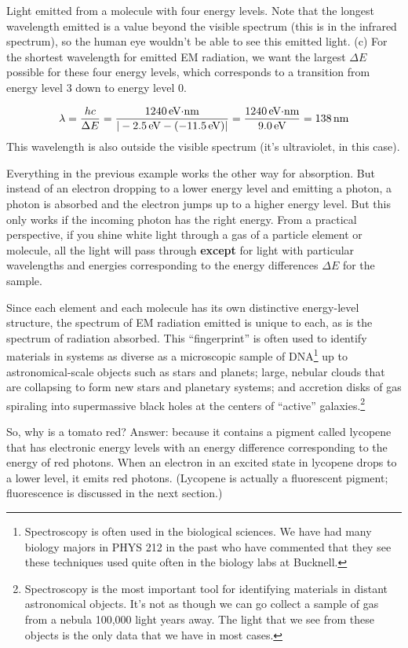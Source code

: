 \begin{example}{Light emitted from a molecule with four energy levels.}
Note that the longest wavelength emitted is a value beyond the visible spectrum
(this is in the infrared spectrum), so the human eye wouldn't be able
to see this emitted light. 
(c) For the shortest wavelength for emitted EM radiation, we want the
largest $\Delta E$ possible for these four energy levels, which corresponds
to a transition from energy level 3 down to energy level 0. 

\begin{equation}
\lambda = \frac{hc}{\Delta E} = \frac{1240 \,\mbox{eV$\cdot$nm}}{|-2.5 \,\mbox{eV} - (-11.5 \,\mbox{eV})|} 
= \frac{1240 \,\mbox{eV$\cdot$nm}}{9.0 \,\mbox{eV}} = 138 \,\mbox{nm} \nonumber
\end{equation}
This wavelength is also outside the visible spectrum (it's ultraviolet, in 
this case).
\end{example}

Everything in the previous example works the other way for absorption. 
But instead of an electron dropping to a lower energy level and emitting
a photon, a photon is absorbed and the electron jumps up to a higher
energy level. But this only works if the incoming photon has the right
energy. From a practical perspective, if you shine white light through
a gas of a particle element or molecule, all the light will pass through
{\bf except} for light with particular wavelengths and energies corresponding
to the energy differences $\Delta E$ for the sample.

Since each element and each molecule has its own distinctive energy-level
structure, the spectrum of EM radiation emitted is unique to each, as
is the spectrum of radiation absorbed. This
``fingerprint'' is often used to identify materials in systems as diverse
as a microscopic sample of DNA\footnote{Spectroscopy is often used in
the biological sciences. We have had many biology majors in PHYS 212
in the past who have commented that they see these techniques used quite
often in the biology labs at Bucknell.} up to astronomical-scale objects
such as stars and planets; large, nebular clouds that are collapsing to 
form new stars and planetary systems; and accretion disks of gas spiraling
into supermassive black holes at the centers of ``active'' 
galaxies.\footnote{Spectroscopy is the most important tool for identifying 
materials in distant astronomical objects. It's not as though we can go
collect a sample of gas from a nebula 100,000 light years away. The light
that we see from these objects is the only data that we have in most
cases.}

So, why is a tomato red? Answer: because it contains a pigment called
lycopene that has electronic energy levels with an energy difference
corresponding to the energy of red photons. When an electron in an excited
state in lycopene drops to a lower level, it emits red photons. (Lycopene 
is actually a fluorescent pigment; fluorescence is discussed in the next
section.)

